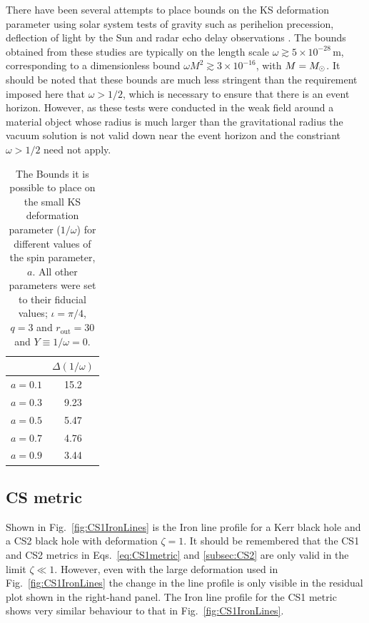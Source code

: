 There have been several attempts to place bounds on the KS deformation parameter using solar system tests of gravity such as perihelion precession, deflection of light by the Sun and radar echo delay observations \citep{2011GReGr..43.1401L,2011RSPSA.467.1390H,2011IJMPD..20.1079I}. The bounds obtained from these studies are typically on the length scale $\omega\gtrsim 5\times 10^{-28}\,\textrm{m}$, corresponding to a dimensionless bound $\omega M^{2} \gtrsim 3\times 10^{-16}$, with $M=M_{ \odot }$. It should be noted that these bounds are much less stringent than the requirement imposed here that $\omega>1/2$, which is necessary to ensure that there is an event horizon. However, as these tests were conducted in the weak field around a material object whose radius is much larger than the gravitational radius the vacuum solution is not valid down near the event horizon and the constriant $\omega>1/2$ need not apply.

\begin{table}[h]
\begin{center}
\begin{tabular}{ l | c  }
	&$\Delta (1/\omega)$\\
\hline
$a=0.1$ &  15.2 \\
$a=0.3$ &  9.23 \\
$a=0.5$ &  5.47 \\
$a=0.7$ &  4.76 \\
$a=0.9$ &  3.44 \\
\end{tabular}
\end{center}
\caption{The Bounds it is possible to place on the small KS deformation parameter ($1/\omega$) for different values of the spin parameter, $a$. All other parameters were set to their fiducial values; $\iota=\pi/4$, $q=3$ and $r_{\textrm{out}}=30$ and $Y\equiv 1/\omega=0$.}
\label{tab:KS}
\end{table}



\subsection{CS metric}\label{subsubsec:CS1res}
Shown in Fig.\ \ref{fig:CS1IronLines} is the Iron line profile for a Kerr black hole and a CS2 black hole with deformation $\zeta=1$. It should be remembered that the CS1 and CS2 metrics in Eqs.\ \ref{eq:CS1metric} and \ref{subsec:CS2} are only valid in the limit $\zeta\ll 1$. However, even with the large deformation used in Fig.\ \ref{fig:CS1IronLines} the change in the line profile is only visible in the residual plot shown in the right-hand panel. The Iron line profile for the CS1 metric shows very similar behaviour to that in Fig.\ \ref{fig:CS1IronLines}.

